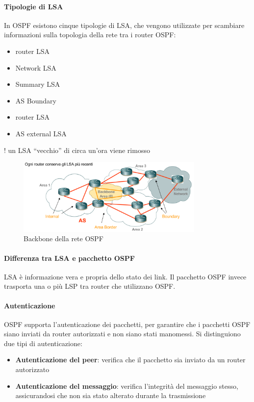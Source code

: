 \paragraph{Tipologie di LSA}
In OSPF esistono cinque tipologie di LSA, che vengono utilizzate per scambiare informazioni sulla topologia della rete tra i router OSPF:
\begin{multicols}{2}
\begin{itemize}
    \item router LSA
    \item Network LSA
    \item Summary LSA
    \item AS Boundary
    \item router LSA
    \item AS external LSA
\end{itemize}
\end{multicols}
! un LSA “vecchio” di circa un'ora viene rimosso
\begin{figure}[h!]
    \centering
    \includegraphics[width=0.82\textwidth]{images/backbone.png}
    \caption{Backbone della rete OSPF}
    \label{fig:backbone}
\end{figure}

\newpage
\paragraph{Differenza tra LSA e pacchetto OSPF}
LSA è informazione vera e propria dello stato dei link.
Il pacchetto OSPF invece trasporta una o più LSP tra router che utilizzano OSPF.
\paragraph{Autenticazione}
OSPF supporta l'autenticazione dei pacchetti, per garantire che i pacchetti OSPF siano inviati da router autorizzati e non siano stati manomessi.
Si distinguiono due tipi di autenticazione:
\begin{itemize}
    \item \textbf{Autenticazione del peer}: verifica che il pacchetto sia inviato da un router autorizzato
    \item \textbf{Autenticazione del messaggio}: verifica l'integrità del messaggio stesso, assicurandosi che non sia stato alterato durante la trasmissione
\end{itemize}
